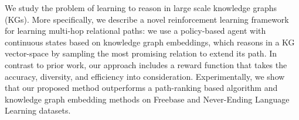 We study the problem of learning to reason in large scale knowledge graphs (KGs). More specifically, we describe a novel reinforcement learning framework for learning multi-hop relational paths: we use a policy-based agent with continuous states based on knowledge graph embeddings, which reasons in a KG vector-space by sampling the most promising relation to extend its path. In contrast to prior work, our approach includes a reward function that takes the accuracy, diversity, and efficiency into consideration. Experimentally, we show that our proposed method outperforms a path-ranking based algorithm and knowledge graph embedding methods on Freebase and Never-Ending Language Learning datasets.
